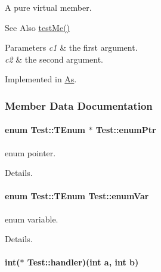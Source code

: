 A pure virtual member. 

\begin{DoxySeeAlso}{See Also}
\hyperlink{classTest_af7115d71dda64654a7104c24f130e8d0}{test\-Me()} 
\end{DoxySeeAlso}

\begin{DoxyParams}{Parameters}
{\em c1} & the first argument. \\
\hline
{\em c2} & the second argument. \\
\hline
\end{DoxyParams}


Implemented in \hyperlink{classAs_aade2dcd0ff4daf62cd578a6f1c11bdff}{As}.



\subsubsection{Member Data Documentation}
\hypertarget{classTest_add1f72d205230e7bac3fcc70a65c1de2}{
\paragraph[{enum\-Ptr}]{\setlength{\rightskip}{0pt plus 5cm}enum {\bf Test\-::\-T\-Enum} 
       $\ast$ Test\-::enum\-Ptr}}\label{classTest_add1f72d205230e7bac3fcc70a65c1de2}


enum pointer. 

Details. \hypertarget{classTest_a0bd371828a36ad7ea83dfd07b2a672b5}{
\paragraph[{enum\-Var}]{\setlength{\rightskip}{0pt plus 5cm}enum {\bf Test\-::\-T\-Enum}
        Test\-::enum\-Var}}\label{classTest_a0bd371828a36ad7ea83dfd07b2a672b5}


enum variable. 

Details. \hypertarget{classTest_a8bef142724c4059c18f752e630a4d925}{
\paragraph[{handler}]{\setlength{\rightskip}{0pt plus 5cm}int($\ast$ Test\-::handler)(int a, int b)}}\label{classTest_a8bef142724c4059c18f752e630a4d925}



